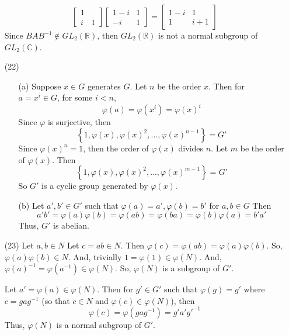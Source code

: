 \documentclass[12pt]{article}
\begin{document}
\begin{itemize}
$$\begin{bmatrix}
1 \\
i & 1
\end{bmatrix}\begin{bmatrix}
1 - i & 1\\
-i & 1
\end{bmatrix} = \begin{bmatrix}
1-i & 1 \\
1 & i+1
\end{bmatrix}$$
Since $BAB^{-1} \not \in GL_2(\mathbb{R})$, then $GL_2(\mathbb{R})$ is not a normal subgroup of $GL_2(\mathbb{C})$.
\item[(22)]
\begin{itemize}
\item[(a)]
Suppose $x \in G$ generates $G$. Let $n$ be the order $x$. Then for $a = x^i \in G$, for some $i < n$,
$$\varphi(a) = \varphi(x^i) = \varphi(x)^i$$
Since $\varphi$ is surjective, then
$$\left\lbrace 1, \varphi(x), \varphi(x)^2, ..., \varphi(x)^{n-1} \right\rbrace = G'$$
Since $\varphi(x)^n = 1$, then the order of $\varphi(x)$ divides $n$. Let $m$ be the order of $\varphi(x)$. Then
$$\left\lbrace 1, \varphi(x), \varphi(x)^2, ..., \varphi(x)^{m-1} \right\rbrace = G'$$
So $G'$ is a cyclic group generated by $\varphi(x)$.
\item[(b)]
Let $a', b' \in G'$ such that $\varphi(a) = a', \varphi(b) = b'$ for $a, b \in G$ Then
$$a'b' = \varphi(a)\varphi(b) = \varphi(ab) = \varphi(ba) = \varphi(b)\varphi(a) = b'a'$$
Thus, $G'$ is abelian.
\end{itemize}
\item[(23)]
Let $a, b \in N$ Let $c = ab \in N$. Then $\varphi(c) = \varphi(ab) = \varphi(a)\varphi(b)$. So, $\varphi(a)\varphi(b) \in N$. And, trivially $1 = \varphi(1) \in \varphi(N)$. And, $\varphi(a)^{-1} = \varphi(a^{-1}) \in \varphi(N)$. So, $\varphi(N)$ is a subgroup of $G'$.

Let $a' = \varphi(a) \in \varphi(N)$. Then for $g' \in G'$ such that $\varphi(g) = g'$ where $c = gag^{-1}$ (so that $c \in N$ and $\varphi(c) \in \varphi(N)$), then
$$\varphi(c) = \varphi(gag^{-1}) = g'a'g'^{-1}$$
Thus, $\varphi(N)$ is a normal subgroup of $G'$.
\end{itemize}
\end{document}
